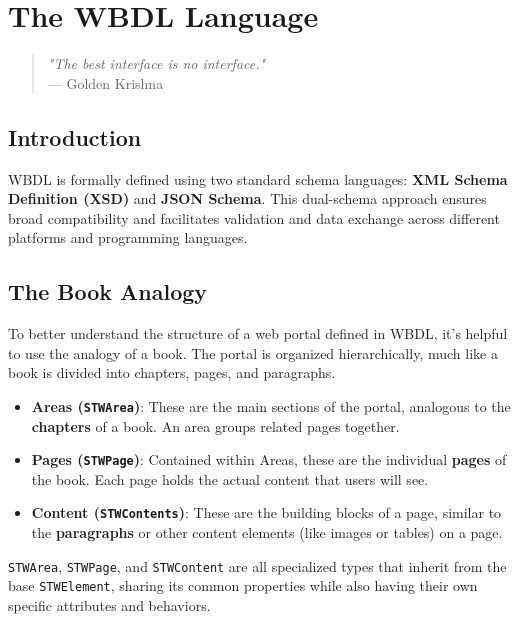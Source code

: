 
\chapter{The WBDL Language}
\label{chap:wbdl}

\begin{quote}
\textit{"The best interface is no interface."} \\
— Golden Krishna
\end{quote}

\section{Introduction}

WBDL is formally defined using two standard schema languages: \textbf{XML Schema Definition (XSD)} and \textbf{JSON Schema}. This dual-schema approach ensures broad compatibility and facilitates validation and data exchange across different platforms and programming languages.

\section{The Book Analogy}

To better understand the structure of a web portal defined in WBDL, it's helpful to use the analogy of a book. The portal is organized hierarchically, much like a book is divided into chapters, pages, and paragraphs.

\begin{itemize}
\item \textbf{Areas (\texttt{STWArea})}: These are the main sections of the portal, analogous to the \textbf{chapters} of a book. An area groups related pages together.
\item \textbf{Pages (\texttt{STWPage})}: Contained within Areas, these are the individual \textbf{pages} of the book. Each page holds the actual content that users will see.
\item \textbf{Content (\texttt{STWContents})}: These are the building blocks of a page, similar to the \textbf{paragraphs} or other content elements (like images or tables) on a page.
\end{itemize}

\texttt{STWArea}, \texttt{STWPage}, and \texttt{STWContent} are all specialized types that inherit from the base \texttt{STWElement}, sharing its common properties while also having their own specific attributes and behaviors.

